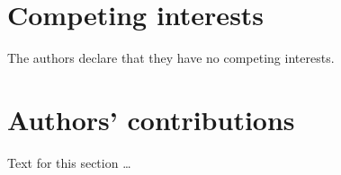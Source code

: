 \documentclass{bmcart}
\begin{document}
\begin{backmatter}
        \section*{Competing interests}
        The authors declare that they have no competing interests.


        \section*{Authors' contributions}
        Text for this section \ldots






\end{backmatter}
\end{document}
